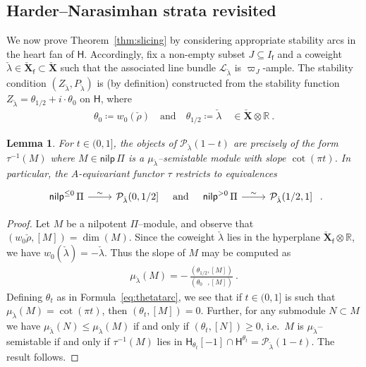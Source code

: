 \documentclass[reqno,a4paper]{amsart}
\newcommand{\calL}{\mathcal{L}}
\newcommand{\calP}{\mathcal{P}}
\newcommand{\R}{\mathbb{R}}
\newcommand{\sfH}{\mathsf{H}}
\newcommand{\sff}{\mathsf{f}}
\newcommand{\bfX}{\mathbf{X}}
\newcommand{\half}{1/2}
\newcommand{\nilpPi}{\mathsf{nilp}\, \Pi}
\newcommand{\nilp}{\mathsf{nilp}}
\newcommand{\Llambda}{{\check{\lambda}}}
\newcommand{\Lrho}{\check{\rho}}
\newcommand{\weightlattice}{\bfX}
\newcommand{\coweightlattice}{\check{\weightlattice}}
\newcommand{\coweightlatticefin}{\coweightlattice_\sff}
\theoremstyle{basic-theorem}
\newtheorem{lemma}[theorem]{Lemma}
\numberwithin{equation}{section}
\begin{document}
\subsection{Harder--Narasimhan strata revisited}\label{subsec:HN-revisited}

We now prove Theorem~\ref{thm:slicing} by considering appropriate stability arcs in the heart fan of $\sfH$. Accordingly, fix a non-empty subset $J\subseteq I_\sff$ and a coweight $\Llambda\in \coweightlatticefin\subset \coweightlattice$ such that the associated line bundle $\calL_{\Llambda}$ is $\varpi_J$-ample. The stability condition $(Z_\Llambda, P_\Llambda)$ is (by definition) constructed from the stability function $Z_\Llambda=\theta_{\half}+i\cdot\theta_0$ on $\sfH$, where
\begin{align}
	\theta_0\coloneqq w_0(\Lrho) \quad\text{and}\quad \theta_{\half} \coloneqq \Llambda \quad \in \coweightlattice\otimes\R\ .
\end{align}

\begin{lemma}\label{lem:bridgeland-to-slope}
    For $t\in (0,1]$, the objects of $\calP_\Llambda(1-t)$ are precisely of the form $\tau^{-1}(M)$ where $M\in \nilpPi$ is a $\mu_\Llambda$--semistable module with slope $\cot(\pi t)$. In particular, the $A$-equivariant functor
    $\tau$ restricts to equivalences
	\begin{align}
		\begin{tikzcd}[ampersand replacement=\&]
				\nilp^{\leq 0}\,\Pi\ar{r}{\sim}\& \calP_\Llambda (0,\half]
		\end{tikzcd}
	\quad\text{and}\quad
	\begin{tikzcd}[ampersand replacement=\&]
		\nilp^{> 0}\,\Pi\ar{r}{\sim}\& \calP_\Llambda (\half,1]
	\end{tikzcd}\ .
	\end{align}
\end{lemma}

\begin{proof}
	Let $M$ be a nilpotent $\Pi$--module, and observe that $(w_0\Lrho, [M])=\dim(M)$. Since the coweight $\Llambda$ lies in the hyperplane $\coweightlatticefin\otimes \R$, we have $w_0(\Llambda)=-\Llambda$. Thus the slope of $M$ may be computed as
	\begin{align}
        \mu_\Llambda(M)=-\,\frac{(\theta_{\half}, [M])}{(\theta_{0\phantom{/2}}, [M])}\ .
	\end{align}
	Defining $\theta_t$ as in Formula~\eqref{eq:thetatarc}, we see that if $t\in (0,1]$ is such that $\mu_\Llambda(M)=\cot(\pi t)$, then $(\theta_t, [M])=0$. Further, for any submodule $N\subset M$ we have $\mu_\Llambda(N)\leq \mu_\Llambda(M)$ if and only if $(\theta_t,[N])\geq 0$, i.e.\ $M$ is $\mu_\Llambda$--semistable if and only if $\tau^{-1}(M)$ lies in $\sfH_{\theta_t}[-1]\cap \sfH^{\theta_t}=\calP_\Llambda(1-t)$. The result follows.
\end{proof}
\end{document}
